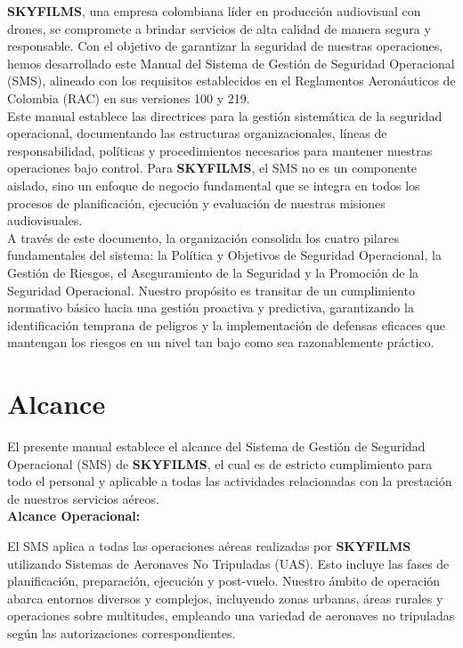 
\textbf{SKYFILMS}, una empresa colombiana líder en producción audiovisual con drones, se compromete a brindar servicios de alta calidad de manera segura y responsable. Con el objetivo de garantizar la seguridad de nuestras operaciones, hemos desarrollado este Manual del Sistema de Gestión de Seguridad Operacional (SMS), alineado con los requisitos establecidos en el Reglamentos Aeronáuticos de Colombia (RAC) en sus versiones 100 y 219.\\

Este manual establece las directrices para la gestión sistemática de la seguridad operacional, documentando las estructuras organizacionales, líneas de responsabilidad, políticas y procedimientos necesarios para mantener nuestras operaciones bajo control. Para \textbf{SKYFILMS}, el SMS no es un componente aislado, sino un enfoque de negocio fundamental que se integra en todos los procesos de planificación, ejecución y evaluación de nuestras misiones audiovisuales.\\

A través de este documento, la organización consolida los cuatro pilares fundamentales del sistema: la Política y Objetivos de Seguridad Operacional, la Gestión de Riesgos, el Aseguramiento de la Seguridad y la Promoción de la Seguridad Operacional. Nuestro propósito es transitar de un cumplimiento normativo básico hacia una gestión proactiva y predictiva, garantizando la identificación temprana de peligros y la implementación de defensas eficaces que mantengan los riesgos en un nivel tan bajo como sea razonablemente práctico.


\section{Alcance}

El presente manual establece el alcance del Sistema de Gestión de Seguridad Operacional (SMS) de \textbf{SKYFILMS}, el cual es de estricto cumplimiento para todo el personal y aplicable a todas las actividades relacionadas con la prestación de nuestros servicios aéreos.\\

\textbf{Alcance Operacional:}

El SMS aplica a todas las operaciones aéreas realizadas por \textbf{SKYFILMS} utilizando Sistemas de Aeronaves No Tripuladas (UAS). Esto incluye las fases de planificación, preparación, ejecución y post-vuelo. Nuestro ámbito de operación abarca entornos diversos y complejos, incluyendo zonas urbanas, áreas rurales y operaciones sobre multitudes, empleando una variedad de aeronaves no tripuladas según las autorizaciones correspondientes.\\

